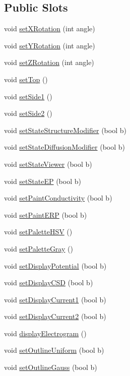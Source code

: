 \subsection*{Public Slots}
\begin{DoxyCompactItemize}
\item 
void \hyperlink{classgl_atrium_aa5afd6c2c43a3b9445e6821586671c36}{set\+X\+Rotation} (int angle)
\item 
void \hyperlink{classgl_atrium_a4b339e5080f2019dec3e916b4348f41c}{set\+Y\+Rotation} (int angle)
\item 
void \hyperlink{classgl_atrium_aab5b1212e320c13d3d3f30425f8e2028}{set\+Z\+Rotation} (int angle)
\item 
void \hyperlink{classgl_atrium_adb2aa7af154e4d83ca976bd7042726aa}{set\+Top} ()
\item 
void \hyperlink{classgl_atrium_a1ea5edb0605ee17d77d636c81dbc74a9}{set\+Side1} ()
\item 
void \hyperlink{classgl_atrium_aab139e009363e2a027e4f3a5e3f1e84b}{set\+Side2} ()
\item 
void \hyperlink{classgl_atrium_a10acfe771a3112264051aaecd87bc4d6}{set\+State\+Structure\+Modifier} (bool b)
\item 
void \hyperlink{classgl_atrium_a4712eeb59127c712ca5ed3e9ea2363d6}{set\+State\+Diffusion\+Modifier} (bool b)
\item 
void \hyperlink{classgl_atrium_a4fdc27d1e3a4b46fb4e545b5d5452656}{set\+State\+Viewer} (bool b)
\item 
void \hyperlink{classgl_atrium_a1bc8825c11be22bef34d80d8e92bba1d}{set\+State\+E\+P} (bool b)
\item 
void \hyperlink{classgl_atrium_a6c943af88177755f0dac95d12767cd22}{set\+Paint\+Conductivity} (bool b)
\item 
void \hyperlink{classgl_atrium_a4deff8ebaa4b5042643cbd1acefa7128}{set\+Paint\+E\+R\+P} (bool b)
\item 
void \hyperlink{classgl_atrium_a5a67ffc011f4545b7ecf4d8a745a6c06}{set\+Palette\+H\+S\+V} ()
\item 
void \hyperlink{classgl_atrium_acf6258aaf1d7c1a8cd7afe558bfd8fa4}{set\+Palette\+Gray} ()
\item 
void \hyperlink{classgl_atrium_a41253a382f5aa16fd076770782672661}{set\+Display\+Potential} (bool b)
\item 
void \hyperlink{classgl_atrium_a0d8ebb9fd216ef5ffa626071139ee26d}{set\+Display\+C\+S\+D} (bool b)
\item 
void \hyperlink{classgl_atrium_a7a56112f029a3a8f6943841735a12a76}{set\+Display\+Current1} (bool b)
\item 
void \hyperlink{classgl_atrium_a22f57b77572b7535269afc46a4126a53}{set\+Display\+Current2} (bool b)
\item 
void \hyperlink{classgl_atrium_a37275a26952f199c55df1ed3b38b6887}{display\+Electrogram} ()
\item 
void \hyperlink{classgl_atrium_a1b033aa6b6df0e8f73c0199ddfea108f}{set\+Outline\+Uniform} (bool b)
\item 
void \hyperlink{classgl_atrium_a2763b82810f80bd56ac251971637df46}{set\+Outline\+Gauss} (bool b)
\end{DoxyCompactItemize}
